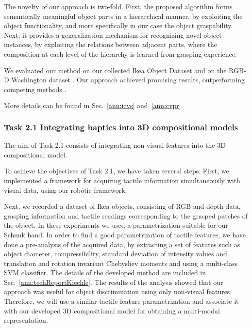 \documentclass[a4paper,11pt,pdf]{pacmanreport}
\begin{document}
The novelty of our approach is two-fold. First, the proposed algorithm forms semantically meaningful object parts in a hierarchical manner, by exploiting the object functionality, and more specifically in our case the object graspability. Next, it provides a generalization mechanism for recognizing novel object instances, by exploiting the relations between adjacent parts, where the composition at each level of the hierarchy is learned from grasping experience.

We evaluated our method on our collected Ikea Object Dataset \cite{website} and on the RGB-D Washington dataset \cite{rgbd-dataset}. Our approach achieved promising results, outperforming competing methods \cite{rel7}.

More details can be found in Sec.~\ref{ann:icvs} and~\ref{ann:cvpr}. %


\subsubsection{Task 2.1 Integrating haptics into 3D compositional models}

The aim of Task 2.1 consists of integrating non-visual features into the 3D 
compositional model.

To achieve the objectives of Task 2.1, we have taken several steps. First, we 
implemented a framework for acquiring tactile information simultaneously with 
visual data, using our robotic framework. 

Next, we recorded a dataset of Ikea objects, consisting of RGB and depth data, 
grasping information and tactile readings corresponding to the grasped patches 
of the object. In these experiments we used a parametrization suitable for our 
Schunk hand. In order to find a good parametrization of tactile features, we 
have done a pre-analysis of the acquired data, by extracting a set of features 
such as object diameter, compressibility, standard deviation of intensity values 
and translation and rotation invariant Chebyshev moments and using a multi-class 
SVM classifier. The details of the developed method are included in Sec.~\ref{ann:techReportKiechle}. The results of the analysis showed that our 
approach was useful for object discrimination using only non-visual features. 
Therefore, we will use a similar tactile feature parametrization and associate 
it with our developed 3D compositional model for obtaining a multi-modal 
representation.
\end{document}

